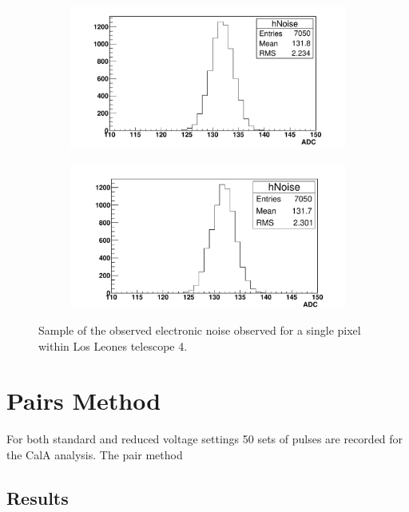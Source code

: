 \begin{figure} %
\centering
\begin{subfigure}[b]{0.95\textwidth}
\includegraphics[width=\textwidth]{chapters/graphs/GainVarsMeas/LL_m04_2016-06-11/example_NoiseHist1.pdf}
\caption{}
\end{subfigure}
\vspace{3mm}
\begin{subfigure}[b]{0.95\textwidth}
\includegraphics[width=\textwidth]{chapters/graphs/GainVarsMeas/LL_m04_2016-06-11/example_NoiseHist2.pdf}
\caption{}
\end{subfigure}
\caption{Sample of the observed electronic noise observed for a single pixel within Los Leones telescope 4.}
\end{figure}

\section{Pairs Method}

For both standard and reduced voltage settings 50 sets of pulses are recorded for the CalA analysis. The pair method

\subsection{Results}

